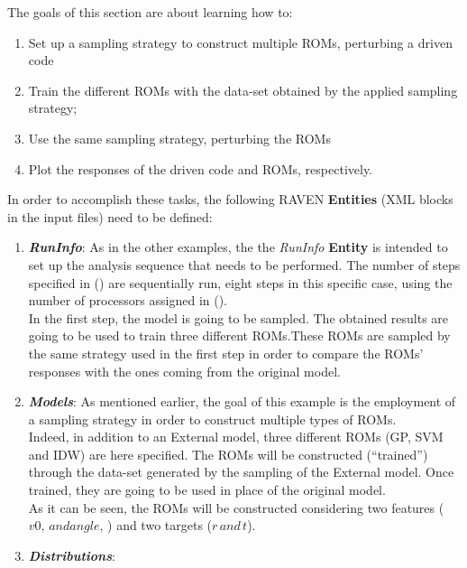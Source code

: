 The goals of this section are about learning how to:
 \begin{enumerate}
   \item Set up a sampling strategy to construct multiple ROMs, perturbing a driven code
   \item Train the different ROMs with the data-set obtained by the applied sampling strategy;
   \item Use the same sampling strategy, perturbing the ROMs
   \item Plot the responses of the driven code and ROMs, respectively.
\end{enumerate}
In order to accomplish these tasks, the following RAVEN \textbf{Entities} (XML blocks in the input files) need to be defined:
\begin{enumerate}
   \item \textbf{\textit{RunInfo}}:
   As in the other examples, the the \textit{RunInfo} \textbf{Entity} is intended  to set up the analysis sequence that
   needs to be performed. The number of steps specified in () are sequentially run, eight steps in this specific case, using the number of processors assigned in ().
   \\In the first step, the model is going to be sampled. The obtained results are going to be used to  train three different ROMs.These ROMs are sampled by the same strategy used in the first step in order to compare the ROMs' responses with the ones coming from the original model.
   \item \textbf{\textit{Models}}:
 As mentioned earlier, the goal of this example is the employment of
 a sampling strategy in order to construct multiple types of ROMs.
 \\Indeed, in addition to an External model,
 three different ROMs (GP, SVM and IDW) are here specified. The ROMs will be
 constructed (``trained'') through the data-set generated by the sampling of the External model. Once trained, they are going  to be used in place of the original model.
 \\As it can be seen, the ROMs will be constructed considering two features ($v0,\, and angle,\,$) and two targets  ($r \, and \, t$).
   \item \textbf{\textit{Distributions}}:

\end{enumerate}
